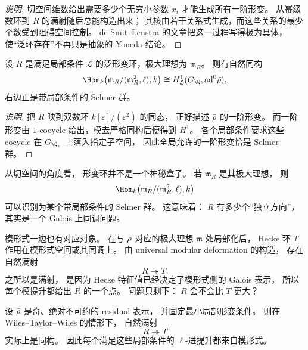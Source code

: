 \begin{proof}[说明]
切空间维数给出需要多少个无穷小参数 $x_i$ 才能生成所有一阶形变。
从幂级数环到 $R$ 的满射随后总能构造出来；
其核由若干关系式生成，而这些关系的最少个数受到阻碍空间控制。
de Smit--Lenstra 的文章把这一过程写得极为具体，
使“泛环存在”不再只是抽象的 Yoneda 结论。
\end{proof}

\begin{proposition}
\label{prop:ch10-tangent-selmer}
设 $R$ 是满足局部条件 $\mathcal L$ 的泛形变环，极大理想为 $\mathfrak m_R$。
则有自然同构
\[
  \Hom_k\bigl(\mathfrak m_R/(\mathfrak m_R^2,\ell),k\bigr)
  \cong
  H^1_{\mathcal L}(G_\Q,\mathrm{ad}^0\rhobar),
\]
右边正是带局部条件的 Selmer 群。
\end{proposition}

\begin{proof}[说明]
把 $R$ 映到双数环 $k[\varepsilon]/(\varepsilon^2)$ 的同态，
正好描述 $\bar{\rho}$ 的一阶形变。
而一阶形变由 $1$-cocycle 给出，模去严格同构后便得到 $H^1$。
各个局部条件要求这些 cocycle 在 $G_{\Q_v}$ 上落入指定子空间，
因此全局允许的一阶形变恰是 Selmer 群。
\end{proof}

从切空间的角度看，
形变环并不是一个神秘盒子。
若 $\mathfrak m_R$ 是其极大理想，
则
\[
  \Hom_k\bigl(\mathfrak m_R/(\mathfrak m_R^2,\ell),k\bigr)
\]
可以识别为某个带局部条件的 Selmer 群。
这意味着：
$R$ 有多少个“独立方向”，
其实是一个 Galois 上同调问题。

模形式一边也有对应对象。
在与 $\bar{\rho}$ 对应的极大理想 $\mathfrak m$ 处局部化后，
Hecke 环 $T$ 作用在模形式空间或其同调上。
由 universal modular deformation 的构造，
存在自然满射
\[
  R\twoheadrightarrow T.
\]
之所以是满射，
是因为 Hecke 特征值已经决定了模形式侧的 Galois 表示，
所以每个模提升都给出 $R$ 的一个点。
问题只剩下：
$R$ 会不会比 $T$ 更大？

\begin{theorem}[Wiles 的 $R=T$ 定理，简化表述]
\label{thm:ch10-rt}
设 $\bar{\rho}$ 是奇、绝对不可约的 residual 表示，
并固定最小局部形变条件。
则在 Wiles--Taylor--Wiles 的情形下，
自然满射
\[
  R\twoheadrightarrow T
\]
实际上是同构。
因此每个满足这些局部条件的 $\ell$-进提升都来自模形式。
\end{theorem}

